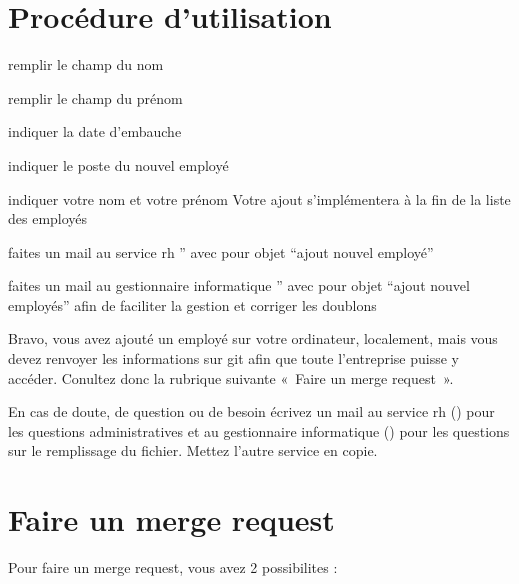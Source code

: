 \documentclass[letterpaper,10pt,french]{sphinxmanual}
\begin{document}
\chapter{Procédure d’utilisation}
\label{\detokenize{Procedure_utilisation:procedure-d-utilisation}}\label{\detokenize{Procedure_utilisation::doc}}\begin{description}
\sphinxlineitem{::}
\sphinxhyphen{} remplir le champ du nom

\sphinxhyphen{} remplir le champ du prénom

\sphinxhyphen{} indiquer la date d’embauche

\sphinxhyphen{} indiquer le poste du nouvel employé

\sphinxhyphen{} indiquer votre nom et votre prénom Votre ajout s’implémentera à la fin de la liste des employés

\sphinxhyphen{} faites un mail au service rh ” avec pour objet “ajout nouvel employé”

\sphinxhyphen{} faites un mail au gestionnaire informatique ” avec pour objet “ajout nouvel employés” afin de faciliter la gestion et corriger les doublons

\sphinxhyphen{} Bravo, vous avez ajouté un employé sur votre ordinateur, localement, mais vous devez renvoyer les informations sur git afin que toute l’entreprise puisse y accéder.
Conultez donc la rubrique suivante « Faire un merge request ».

\end{description}

\sphinxAtStartPar
En cas de doute, de question ou de besoin écrivez un mail au service rh () pour les questions administratives et au gestionnaire informatique () pour les questions sur le remplissage du fichier. Mettez l’autre service en copie.

\sphinxstepscope


\chapter{Faire un merge request}
\label{\detokenize{faire_un_merge_request:faire-un-merge-request}}\label{\detokenize{faire_un_merge_request::doc}}
\sphinxAtStartPar
Pour faire un merge request, vous avez 2 possibilites :
\end{document}
